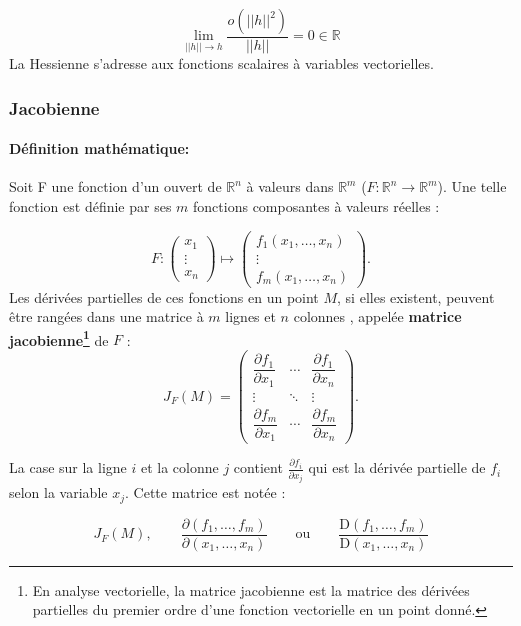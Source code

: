 $$
\lim\limits_{||h|| \to h} \frac{o(||h||^2)}{||h||} = 0  \in \mathbb{R}
$$
La Hessienne s’adresse aux fonctions scalaires à variables vectorielles.

\subsubsection{\textbf{Jacobienne}}
\paragraph*{Définition mathématique:}
Soit F une fonction d'un ouvert de $\mathbb{R}^{n}$ à valeurs dans $\mathbb{R}^{m}$ ($F:\mathbb{R}^{n}\to \mathbb {R}^{m}$). Une telle fonction est définie par ses $m$ fonctions composantes à valeurs réelles :

$$ 
{ F:
	{\begin{pmatrix}
		x_{1}\\\vdots \\
		x_{n}
		\end{pmatrix}}
	\longmapsto 
	{\begin{pmatrix}
		f_{1}(x_{1},\dots ,x_{n})\\
		\vdots \\f_{m}(x_{1},\dots ,x_{n})
		\end{pmatrix}}}.
$$
Les dérivées partielles de ces fonctions en un point $M$, si elles existent, peuvent être rangées dans une matrice à $m$ lignes et $n$ colonnes \cite{jtshiman:2021}, appelée \textbf{matrice jacobienne\footnote{En analyse vectorielle, la matrice jacobienne est la matrice des dérivées partielles du premier ordre d'une fonction vectorielle en un point donné.}} de $F$ :
$$
J_{F}\left(M\right)={
	\begin{pmatrix}
	{\dfrac {\partial f_{1}}{\partial x_{1}}}&\cdots &{\dfrac {\partial f_{1}}{\partial x_{n}}}\\
	\vdots &\ddots &\vdots \\
	{\dfrac {\partial f_{m}}{\partial x_{1}}}&\cdots &{\dfrac {\partial f_{m}}{\partial x_{n}}}
	\end{pmatrix}}.
$$

La case sur la ligne $i$ et la colonne $j$ contient ${\displaystyle {\frac {\partial f_{i}}{\partial x_{j}}}}$ qui est la dérivée partielle de $f_i$ selon la variable $x_j$. Cette matrice est notée :

$${\displaystyle J_{F}\left(M\right),\qquad {\frac {\partial \left(f_{1},\ldots ,f_{m}\right)}{\partial \left(x_{1},\ldots ,x_{n}\right)}}\qquad {\text{ou}}\qquad {\frac {\mathrm {D} \left(f_{1},\ldots ,f_{m}\right)}{\mathrm {D} \left(x_{1},\ldots ,x_{n}\right)}}}$$

